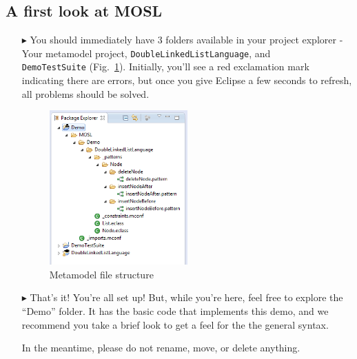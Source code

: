 \newpage
\texHeader
\hypertarget{simpleDemo tex}{} 
\subsection{A first look at MOSL}

\begin{itemize}

\item[$\blacktriangleright$] You should immediately have 3 folders available in your project explorer - Your metamodel project,
\texttt{DoubleLinkedListLanguage}, and \\ \texttt{DemoTestSuite} (Fig.~\ref{fig:texErrors}). Initially, you'll see a red exclamation mark indicating there
are errors, but once you give Eclipse a few seconds to refresh, all problems should be solved.

\vspace{1cm}

\begin{figure}[htp]
\begin{center}
  \includegraphics[width=0.5\textwidth]{eclipse_loadedTexDemo}
  \caption{Metamodel file structure}
  \label{fig:texErrors}
\end{center}
\end{figure}

\vspace{1cm}

\item[$\blacktriangleright$] That's it! You're all set up! But, while you're here, feel free to explore the ``Demo'' folder. It has the basic code that implements
this demo, and we recommend you take a brief look to get a feel for the the general syntax.

In the meantime, please do not rename, move, or delete anything.

\end{itemize}
